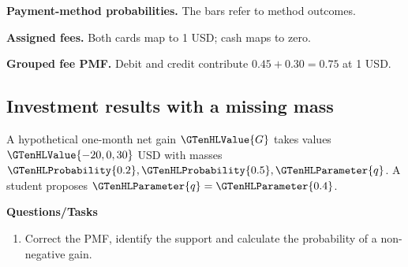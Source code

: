 \par\noindent \begin{minipage}[t]{.32\linewidth}
\centering
{}
\par\small \textbf{Payment-method probabilities.} The bars refer to method outcomes.
\end{minipage}\hfill\begin{minipage}[t]{.32\linewidth}
\centering
{}
\par\small \textbf{Assigned fees.} Both cards map to 1 USD; cash maps to zero.
\end{minipage}\hfill\begin{minipage}[t]{.32\linewidth}
\centering
{}
\par\small \textbf{Grouped fee PMF.} Debit and credit contribute $0.45+0.30=0.75$ at 1 USD.
\end{minipage}\par\medskip


\subsection{Investment results with a missing mass}
A hypothetical one-month net gain $\GTenHLValue{G}$ takes values $\GTenHLValue{-20,0,30}$ USD with masses $\GTenHLProbability{0.2},\GTenHLProbability{0.5},\GTenHLParameter{q}$. A student proposes $\GTenHLParameter{q}=\GTenHLParameter{0.4}$.

\textbf{Questions/Tasks}
\begin{enumerate}
\item Correct the PMF, identify the support and calculate the probability of a non-negative gain.
\end{enumerate}
